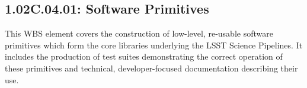 \subsection{1.02C.04.01: Software Primitives}

This WBS element covers the construction of low-level, re-usable software
primitives which form the core libraries underlying the LSST Science
Pipelines. It includes the production of test suites demonstrating the correct
operation of these primitives and technical, developer-focused documentation
describing their use.
